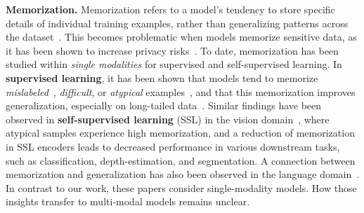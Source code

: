 \textbf{Memorization.}
Memorization refers to a model's tendency to store specific details of individual training examples, rather than generalizing patterns across the dataset~\citep{zhang2016understanding,arpit2017closer,chatterjee2018learning,feldman2020does}. This becomes problematic when models memorize sensitive data, as it has been shown to increase privacy risks~\citep{carlini2019secret, carlini2021extracting, carlini2022privacy,song2017machine}. 
To date, memorization has been studied within \textit{single modalities} for supervised and self-supervised learning.
In \textbf{supervised learning}, it has been shown that models tend to memorize \textit{mislabeled}~\citep{feldman2020does}, \textit{difficult}, or \textit{atypical} examples~\citep{arpit2017closer,sadrtdinov2021memorization}, and that this memorization improves generalization, especially on long-tailed data~\citep{feldman2020does,feldman2020neural}.
Similar findings have been observed in \textbf{self-supervised learning} (SSL) in the vision domain~\citep{wang2024memorization}, where atypical samples experience high memorization, and a reduction of memorization in SSL encoders leads to decreased performance in
various downstream tasks, such as classification, depth-estimation, and segmentation.
A connection between memorization and generalization has also been observed in the language domain~\citep{antoniades2024generalization,tirumala2022memorization}.
In contrast to our work, these papers consider single-modality models. How those insights transfer to multi-modal models remains unclear.


